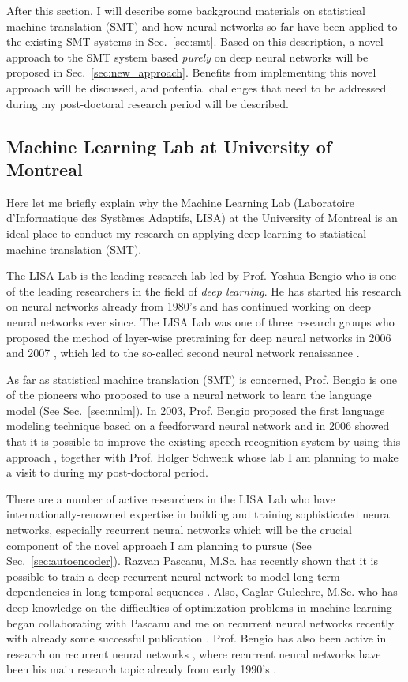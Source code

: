 \documentclass[11pt, oneside]{essay}
\begin{document}
After this section, I will describe some background materials on
statistical machine translation (SMT) and how neural networks so
far have been applied to the existing SMT systems in
Sec.~\ref{sec:smt}. Based on this description, a novel approach to
the SMT system based \textit{purely} on deep neural networks will
be proposed in Sec.~\ref{sec:new_approach}.  Benefits from
implementing this novel approach will be discussed, and
potential challenges that need to be addressed during my
post-doctoral research period will be described.

\subsection{Machine Learning Lab at University of Montreal}

Here let me briefly explain why the Machine Learning Lab
(Laboratoire d'Informatique des Syst\`emes Adaptifs, LISA) at the
University of Montreal is an ideal place to conduct my research on
applying deep learning to statistical machine translation (SMT).

The LISA Lab is the leading research lab led by Prof. Yoshua
Bengio who is one of the leading researchers in the field of
\textit{deep learning}. He has started his research on neural
networks already from 1980's and has continued working on deep
neural networks ever since. The LISA Lab was one of three
research groups who proposed the method of layer-wise pretraining
for deep neural networks in 2006 and 2007 \citep{Bengio2007nips},
which led to the so-called second neural network renaissance
\citep{Schmidhuber2011}.

As far as statistical machine translation (SMT) is concerned, Prof.
Bengio is one of the pioneers who proposed to use a neural
network to learn the language model (See Sec.~\ref{sec:nnlm}). In
2003, Prof. Bengio proposed the first language modeling technique
based on a feedforward neural network \citep{Bengio2003} and in
2006 showed that it is possible to improve the existing speech
recognition system by using this approach \citep{Bengio2006},
together with Prof.  Holger Schwenk whose lab I am
planning to make a visit to during my post-doctoral
period.

There are a number of active researchers in the LISA Lab who have
internationally-renowned expertise in building and training
sophisticated neural networks, especially recurrent neural
networks which will be the crucial component of the novel
approach I am planning to pursue (See
Sec.~\ref{sec:autoencoder}). Razvan Pascanu, M.Sc. has recently
shown that it is possible to train a deep recurrent neural
network to model long-term dependencies in long temporal
sequences \citep{Pascanu2013}. Also, Caglar Gulcehre, M.Sc. who
has deep knowledge on the difficulties of optimization problems
in machine learning \citep{Gulcehre2013a} began
collaborating with Pascanu and me on recurrent neural networks
recently with already some successful publication
\citep{Pascanu2013}. Prof. Bengio has also been active in
research on recurrent neural networks \citep[see,
e.g.,][]{Bengio2013rec}, where recurrent
neural networks have been his main research topic
already from early 1990's \citep[see,
e.g.,][]{Bengio1994}.
\end{document}
